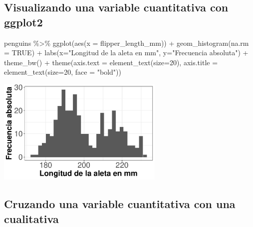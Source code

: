 \documentclass[
  letterpaper,
  DIV=11,
  numbers=noendperiod]{scrreprt}
\newenvironment{Shaded}{\begin{snugshade}}{\end{snugshade}}
\newcommand{\AttributeTok}[1]{\textcolor[rgb]{0.40,0.45,0.13}{#1}}
\newcommand{\ConstantTok}[1]{\textcolor[rgb]{0.56,0.35,0.01}{#1}}
\newcommand{\DecValTok}[1]{\textcolor[rgb]{0.68,0.00,0.00}{#1}}
\newcommand{\FunctionTok}[1]{\textcolor[rgb]{0.28,0.35,0.67}{#1}}
\newcommand{\NormalTok}[1]{\textcolor[rgb]{0.00,0.23,0.31}{#1}}
\newcommand{\SpecialCharTok}[1]{\textcolor[rgb]{0.37,0.37,0.37}{#1}}
\newcommand{\StringTok}[1]{\textcolor[rgb]{0.13,0.47,0.30}{#1}}
\begin{document}
\subsection{Visualizando una variable cuantitativa con
ggplot2}\label{visualizando-una-variable-cuantitativa-con-ggplot2}

\begin{Shaded}
\begin{Highlighting}[]
\NormalTok{penguins }\SpecialCharTok{\%\textgreater{}\%} 
  \FunctionTok{ggplot}\NormalTok{(}\FunctionTok{aes}\NormalTok{(}\AttributeTok{x =}\NormalTok{ flipper\_length\_mm)) }\SpecialCharTok{+}
  \FunctionTok{geom\_histogram}\NormalTok{(}\AttributeTok{na.rm =} \ConstantTok{TRUE}\NormalTok{) }\SpecialCharTok{+}
    \FunctionTok{labs}\NormalTok{(}\AttributeTok{x=}\StringTok{"Longitud de la aleta en mm"}\NormalTok{, }
         \AttributeTok{y=}\StringTok{"Frecuencia absoluta"}\NormalTok{) }\SpecialCharTok{+} 
  \FunctionTok{theme\_bw}\NormalTok{() }\SpecialCharTok{+}
  \FunctionTok{theme}\NormalTok{(}\AttributeTok{axis.text =} \FunctionTok{element\_text}\NormalTok{(}\AttributeTok{size=}\DecValTok{20}\NormalTok{),}
        \AttributeTok{axis.title =} \FunctionTok{element\_text}\NormalTok{(}\AttributeTok{size=}\DecValTok{20}\NormalTok{, }\AttributeTok{face =} \StringTok{"bold"}\NormalTok{))}
\end{Highlighting}
\end{Shaded}

\begin{center}
\includegraphics[width=0.6\textwidth,height=0.4\textheight]{t1_intro_files/figure-pdf/unnamed-chunk-96-1.pdf}
\end{center}

\subsection{Cruzando una variable cuantitativa con una
cualitativa}\label{cruzando-una-variable-cuantitativa-con-una-cualitativa}
\end{document}
